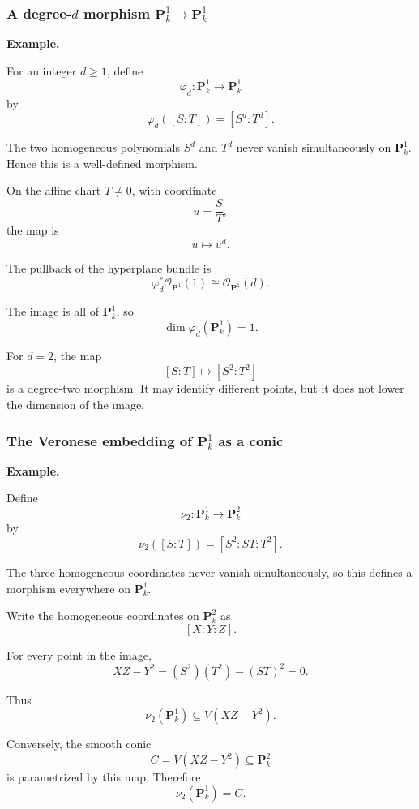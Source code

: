 \subsubsection{\texorpdfstring{A degree-\(d\) morphism \(\mathbf P^1_k\to\mathbf P^1_k\)}{A degree d morphism P1 to P1}}

\textbf{Example.}

For an integer \(d\geq1\), define
\[
\varphi_d:\mathbf P^1_k\longrightarrow\mathbf P^1_k
\]
by
\[
\varphi_d([S:T])
=
[S^d:T^d].
\]

The two homogeneous polynomials \(S^d\) and \(T^d\) never vanish simultaneously on \(\mathbf P^1_k\). Hence this is a well-defined morphism.

On the affine chart \(T\neq0\), with coordinate
\[
u=\frac ST,
\]
the map is
\[
u\longmapsto u^d.
\]

The pullback of the hyperplane bundle is
\[
\varphi_d^*\mathcal O_{\mathbf P^1}(1)
\cong
\mathcal O_{\mathbf P^1}(d).
\]

The image is all of \(\mathbf P^1_k\), so
\[
\dim\varphi_d(\mathbf P^1_k)=1.
\]

For \(d=2\), the map
\[
[S:T]\longmapsto[S^2:T^2]
\]
is a degree-two morphism. It may identify different points, but it does not lower the dimension of the image.

\subsubsection{The Veronese embedding of \(\mathbf P^1_k\) as a conic}

\textbf{Example.}

Define
\[
\nu_2:\mathbf P^1_k\longrightarrow\mathbf P^2_k
\]
by
\[
\nu_2([S:T])
=
[S^2:ST:T^2].
\]

The three homogeneous coordinates never vanish simultaneously, so this defines a morphism everywhere on \(\mathbf P^1_k\).

Write the homogeneous coordinates on \(\mathbf P^2_k\) as
\[
[X:Y:Z].
\]

For every point in the image,
\[
XZ-Y^2
=
(S^2)(T^2)-(ST)^2
=
0.
\]

Thus
\[
\nu_2(\mathbf P^1_k)
\subseteq
V(XZ-Y^2).
\]

Conversely, the smooth conic
\[
C=V(XZ-Y^2)\subseteq\mathbf P^2_k
\]
is parametrized by this map. Therefore
\[
\nu_2(\mathbf P^1_k)=C.
\]

